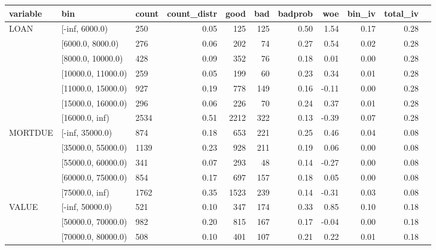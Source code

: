 \begin{landscape}
	\begin{table}[!ht]
		\centering
		\begin{tabular}{lllrrrrrrrr}
			\toprule
			variable & bin &  count &  count\_distr &  good &  bad &   badprob &       woe &    bin\_iv &  total\_iv \\
			\midrule
			    LOAN &      [-inf, 6000.0) &    250 &         0.05 &   125 &  125 &     0.50 &  1.54 &    0.17 &      0.28 \\
     &    [6000.0, 8000.0) &    276 &         0.06 &   202 &   74 &     0.27 &  0.54 &    0.02 &      0.28 \\
     &   [8000.0, 10000.0) &    428 &         0.09 &   352 &   76 &     0.18 &  0.01 &    0.00 &      0.28 \\
     &  [10000.0, 11000.0) &    259 &         0.05 &   199 &   60 &     0.23 &  0.34 &    0.01 &      0.28 \\
     &  [11000.0, 15000.0) &    927 &         0.19 &   778 &  149 &     0.16 & -0.11 &    0.00 &      0.28 \\
     &  [15000.0, 16000.0) &    296 &         0.06 &   226 &   70 &     0.24 &  0.37 &    0.01 &      0.28 \\
     &      [16000.0, inf) &   2534 &         0.51 &  2212 &  322 &     0.13 & -0.39 &    0.07 &      0.28 \\
			\midrule
			 MORTDUE &     [-inf, 35000.0) &    874 &         0.18 &   653 &  221 &     0.25 &  0.46 &    0.04 &      0.08 \\
  &  [35000.0, 55000.0) &   1139 &         0.23 &   928 &  211 &     0.19 &  0.06 &    0.00 &      0.08 \\
  &  [55000.0, 60000.0) &    341 &         0.07 &   293 &   48 &     0.14 & -0.27 &    0.00 &      0.08 \\
  &  [60000.0, 75000.0) &    854 &         0.17 &   697 &  157 &     0.18 &  0.05 &    0.00 &      0.08 \\
  &      [75000.0, inf) &   1762 &         0.35 &  1523 &  239 &     0.14 & -0.31 &    0.03 &      0.08 \\
			\midrule
			   VALUE &       [-inf, 50000.0) &    521 &         0.10 &   347 &  174 &     0.33 &  0.85 &    0.10 &      0.18 \\
    &    [50000.0, 70000.0) &    982 &         0.20 &   815 &  167 &     0.17 & -0.04 &    0.00 &      0.18 \\
    &    [70000.0, 80000.0) &    508 &         0.10 &   401 &  107 &     0.21 &  0.22 &    0.01 &      0.18 \\

\end{tabular}
\end{table}
\end{landscape}
